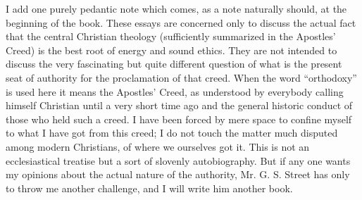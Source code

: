 \documentclass{book}
\begin{document}
I add one purely pedantic note which comes, as a note naturally should, at the beginning of the book. These essays are concerned only to discuss the actual fact that the central Christian theology (sufficiently summarized in the Apostles’ Creed) is the best root of energy and sound ethics. They are not intended to discuss the very fascinating but quite different question of what is the present seat of authority for the proclamation of that creed. When the word “orthodoxy” is used here it means the Apostles’ Creed, as understood by everybody calling himself Christian until a very short time ago and the general historic conduct of those who held such a creed. I have been forced by mere space to confine myself to what I have got from this creed; I do not touch the matter much disputed among modern Christians, of where we ourselves got it. This is not an ecclesiastical treatise but a sort of slovenly autobiography. But if any one wants my opinions about the actual nature of the authority, Mr. G. S. Street has only to throw me another challenge, and I will write him another book.
\end{document}
